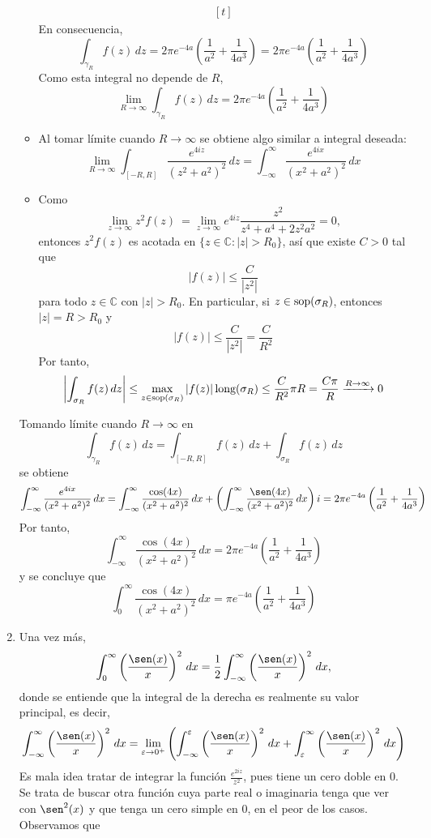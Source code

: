 \documentclass[11pt]{report}
\makeatletter
\renewenvironment{proof}[1][\proofname]{\par
  \pushQED{\qed}%
  \normalfont \topsep\z@skip %
  \trivlist
  \item[\hskip\labelsep
        \itshape
    #1\@addpunct{.}]\ignorespaces
}{%
  \popQED\endtrivlist\@endpefalse
}
\newcommand{\C}{\mathbb C}
\makeatother
\begin{document}
\begin{proof}
\begin{enumerate}
\begin{itemize}
\[\begin{aligned}[t]
  \end{aligned}\]
  En consecuencia,
  \[\int_{\gamma_R} f(z) \, dz = 2\pi e^{-4a}\left(\frac{1}{a^2}+\frac{1}{4a^3}\right) = 2\pi e^{-4a}\left(\frac{1}{a^2}+\frac{1}{4a^3}\right)\]
  Como esta integral no depende de $R$,
  \[\lim_{R \to \infty}\int_{\gamma_R} f(z) \, dz = 2\pi e^{-4a}\left(\frac{1}{a^2}+\frac{1}{4a^3}\right)\]
  \item Al tomar límite cuando $R \to \infty$ se obtiene algo similar a integral deseada:
  \[\lim_{R \to \infty}\int_{[-R,R]} \frac{e^{4iz}}{(z^2+a^2)^2} \, dz = \int_{-\infty}^\infty \frac{e^{4ix}}{(x^2+a^2)^2}\, dx\]
  \item Como
  \[\lim_{z \to \infty} z^2f(z)\ = \lim_{z \to \infty}e^{4iz}\frac{z^2}{z^4+a^4+2z^2a^2} = 0,\]
  entonces $z^2f(z)$ es acotada en $\{z \in \C \colon |z|>R_0\}$, así que existe $C>0$ tal que
  \[|f(z)| \leq \frac{C}{|z^2|}\]
  para todo $z \in \C$ con $|z|>R_0$. En particular, si $z \in \textup{sop}(\sigma_R)$, entonces $|z| = R > R_0$ y 
  \[|f(z)| \leq \frac{C}{|z^2|} = \frac{C}{R^2}\]
  Por tanto,
  \[\left|\int_{\sigma_R} f(z) \, dz\right| \leq \max_{z \in \textup{sop}(\sigma_R)} |f(z)| \, \textup{long}(\sigma_R) \leq \frac{C}{R^2}\pi R = \frac{C\pi}{R} \xrightarrow[]{R \to \infty} 0\]
\end{itemize}
Tomando límite cuando $R \to \infty$ en
\[\int_{\gamma_R} f(z) \, dz = \int_{[-R,R]} f(z) \, dz + \int_{\sigma_R} f(z) \, dz\]
se obtiene
\[\int_{-\infty}^\infty \frac{e^{4ix}}{(x^2+a^2)^2} \, dx =\int_{-\infty}^\infty \frac{\cos(4x)}{(x^2+a^2)^2} \, dx+\left(\int_{-\infty}^\infty \frac{\sen(4x)}{(x^2+a^2)^2} \, dx\right)i = 2\pi e^{-4a}\left(\frac{1}{a^2}+\frac{1}{4a^3}\right) \]
Por tanto,
\[\int_{-\infty}^\infty \frac{\cos(4x)}{(x^2+a^2)^2} \, dx =  2\pi e^{-4a}\left(\frac{1}{a^2}+\frac{1}{4a^3}\right)\]
y se concluye que
\[\int_{0}^\infty \frac{\cos(4x)}{(x^2+a^2)^2} \, dx =  \pi e^{-4a}\left(\frac{1}{a^2}+\frac{1}{4a^3}\right)\]
\item Una vez más,
\[\int_0^\infty \left(\frac{\sen(x)}{x}\right)^2 \, dx = \frac{1}{2}\int_{-\infty}^{\infty}\left(\frac{\sen(x)}{x}\right)^2\, dx, \]
donde se entiende que la integral de la derecha es realmente su valor principal, es decir,
\[\int_{-\infty}^{\infty}\left(\frac{\sen(x)}{x}\right)^2\, dx = \lim_{\varepsilon \to 0^+} \left(\int_{-\infty}^\varepsilon \left(\frac{\sen(x)}{x}\right)^2\, dx+\int_\varepsilon^\infty \left(\frac{\sen(x)}{x}\right)^2\, dx\right)\]
Es mala idea tratar de integrar la función $\frac{e^{2iz}}{z^2}$, pues tiene un cero doble en $0$. Se trata de buscar otra función cuya parte real o imaginaria tenga que ver con $\sen^2(x)$ y que tenga un cero simple en $0$, en el peor de los casos. Observamos que

\end{enumerate}
\end{proof}
\end{document}
